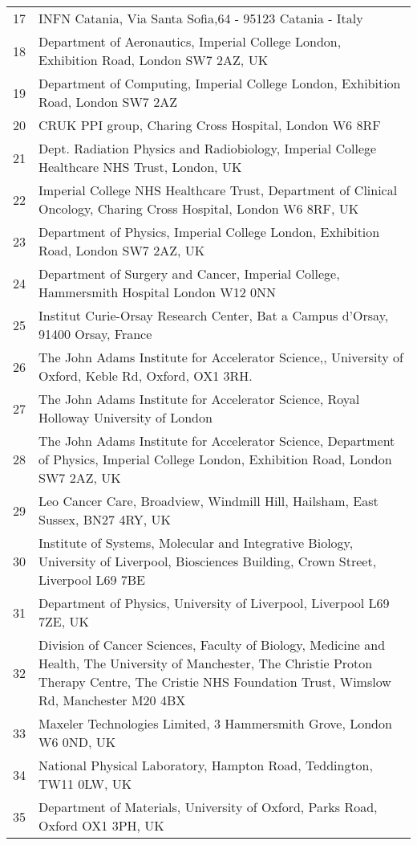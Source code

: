 {\begin{tabular}{ c p{15cm} }
     17 & INFN Catania, Via Santa Sofia,64 - 95123 Catania - Italy\\
     18 & Department of Aeronautics, Imperial College London, Exhibition Road, London SW7 2AZ, UK\\
     19 & Department of Computing, Imperial College London, Exhibition Road, London SW7 2AZ\\
     20 & CRUK PPI group, Charing Cross Hospital, London W6 8RF\\
     21 & Dept. Radiation Physics and Radiobiology, Imperial College Healthcare NHS Trust, London, UK\\
     22 & Imperial College NHS Healthcare Trust, Department of Clinical Oncology, Charing Cross Hospital, London W6 8RF, UK\\
     23 & Department of Physics, Imperial College London, Exhibition Road, London SW7 2AZ, UK\\
     24 & Department of Surgery and Cancer, Imperial College, Hammersmith Hospital London W12 0NN\\
     25 & Institut Curie-Orsay Research Center, Bat a Campus d'Orsay, 91400 Orsay, France\\
     26 & The John Adams Institute for Accelerator Science,, University of Oxford, Keble Rd, Oxford, OX1 3RH.\\
     27 & The John Adams Institute for Accelerator Science, Royal Holloway University of London\\
     28 & The John Adams Institute for Accelerator Science, Department of Physics, Imperial College London, Exhibition Road, London SW7 2AZ, UK\\
     29 & Leo Cancer Care, Broadview, Windmill Hill, Hailsham, East Sussex, BN27 4RY, UK\\
     30 & Institute of Systems, Molecular and Integrative Biology, University of Liverpool, Biosciences Building, Crown Street, Liverpool L69 7BE\\
     31 & Department of Physics, University of Liverpool, Liverpool L69 7ZE, UK\\
     32 & Division of Cancer Sciences, Faculty of Biology, Medicine and Health, The University of Manchester, The Christie Proton Therapy Centre, The Cristie NHS Foundation Trust, Wimslow Rd, Manchester M20 4BX\\
     33 & Maxeler Technologies Limited, 3 Hammersmith Grove, London W6 0ND, UK\\
     34 & National Physical Laboratory, Hampton Road, Teddington, TW11 0LW, UK\\
     35 & Department of Materials, University of Oxford, Parks Road, Oxford OX1 3PH, UK\\
  \end{tabular}
}
 
